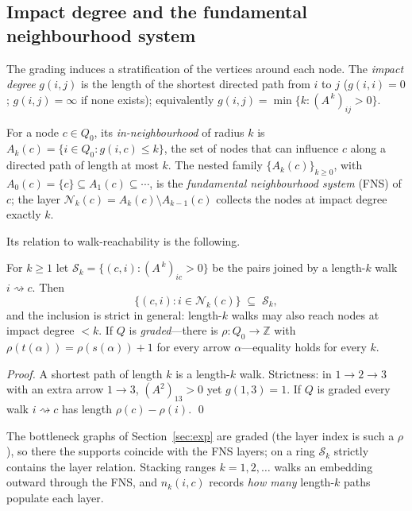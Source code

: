 \documentclass[runningheads]{llncs}
\newcommand{\Adj}{A}
\newcommand{\walk}{\rightsquigarrow}
\begin{document}
\subsection{Impact degree and the fundamental neighbourhood system}
\label{sec:sfv}

The grading induces a stratification of the vertices around each node. The
\emph{impact degree} $g(i,j)$ is the length of the shortest directed path from
$i$ to $j$ ($g(i,i)=0$; $g(i,j)=\infty$ if none exists); equivalently
$g(i,j)=\min\{k:(\Adj^{\,k})_{ij}>0\}$.

\begin{definition}\label{def:sfv}
For a node $c\in Q_0$, its \emph{in-neighbourhood} of radius $k$ is
$A_k(c)=\{i\in Q_0: g(i,c)\le k\}$, the set of nodes that can influence $c$
along a directed path of length at most $k$. The nested family
$\{A_k(c)\}_{k\ge0}$, with $A_0(c)=\{c\}\subseteq A_1(c)\subseteq\cdots$, is
the \emph{fundamental neighbourhood system} (FNS) of $c$; the layer
$\mathcal{N}_k(c)=A_k(c)\setminus A_{k-1}(c)$ collects the nodes at impact
degree exactly $k$.
\end{definition}

Its relation to walk-reachability is the following.

\begin{proposition}\label{prop:fns}
For $k\ge1$ let $\mathcal{S}_k=\{(c,i):(\Adj^{\,k})_{ic}>0\}$ be the pairs
joined by a length-$k$ walk $i\walk c$. Then
\[
  \{(c,i): i\in \mathcal{N}_k(c)\} \;\subseteq\; \mathcal{S}_k ,
\]
and the inclusion is strict in general: length-$k$ walks may also reach nodes
at impact degree $<k$. If $Q$ is \emph{graded}---there is
$\rho\colon Q_0\to\mathbb{Z}$ with $\rho(t(\alpha))=\rho(s(\alpha))+1$ for
every arrow $\alpha$---equality holds for every $k$.
\end{proposition}

\begin{proof}
A shortest path of length $k$ is a length-$k$ walk. Strictness: in
$1\to2\to3$ with an extra arrow $1\to3$, $(\Adj^2)_{13}>0$ yet $g(1,3)=1$. If
$Q$ is graded every walk $i\walk c$ has length $\rho(c)-\rho(i)$. \qed
\end{proof}

The bottleneck graphs of Section~\ref{sec:exp} are graded (the layer index is
such a $\rho$), so there the supports coincide with the FNS layers; on a ring
$\mathcal{S}_k$ strictly contains the layer relation. Stacking ranges
$k=1,2,\dots$ walks an embedding outward through the FNS, and $n_k(i,c)$
records \emph{how many} length-$k$ paths populate each layer.
\end{document}
